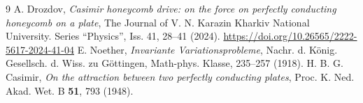 \documentclass[10pt]{article}
\begin{document}
\begin{thebibliography}{9}
A. Drozdov, \textit{Casimir honeycomb drive: on the force on perfectly conducting honeycomb on a plate}, The Journal of V. N. Karazin Kharkiv National University. Series “Physics”, Iss. 41, 28--41 (2024). \url{https://doi.org/10.26565/2222-5617-2024-41-04}
E. Noether, \textit{Invariante Variationsprobleme}, Nachr. d. König. Gesellsch. d. Wiss. zu Göttingen, Math-phys. Klasse, 235–257 (1918).
H. B. G. Casimir, \textit{On the attraction between two perfectly conducting plates}, Proc. K. Ned. Akad. Wet. B \textbf{51}, 793 (1948).
\end{thebibliography}
\end{document}
